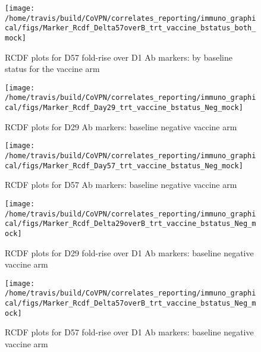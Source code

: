 \documentclass[]{book}
\theoremstyle{definition}
\theoremstyle{definition}
\theoremstyle{definition}
\newcommand{\1}{\mathbbm{1}}
\begin{document}
\begin{figure}[H]

{\centering \texttt{[image: /home/travis/build/CoVPN/correlates\_reporting/immuno\_graphical/figs/Marker\_Rcdf\_Delta57overB\_trt\_vaccine\_bstatus\_both\_mock]} 

}

\caption{RCDF plots for D57 fold-rise over D1 Ab markers: by baseline status for the vaccine arm}\label{fig:unnamed-chunk-28}
\end{figure}

\begin{figure}[H]

{\centering \texttt{[image: /home/travis/build/CoVPN/correlates\_reporting/immuno\_graphical/figs/Marker\_Rcdf\_Day29\_trt\_vaccine\_bstatus\_Neg\_mock]} 

}

\caption{RCDF plots for D29 Ab markers: baseline negative vaccine arm}\label{fig:unnamed-chunk-29}
\end{figure}

\begin{figure}[H]

{\centering \texttt{[image: /home/travis/build/CoVPN/correlates\_reporting/immuno\_graphical/figs/Marker\_Rcdf\_Day57\_trt\_vaccine\_bstatus\_Neg\_mock]} 

}

\caption{RCDF plots for D57 Ab markers: baseline negative vaccine arm}\label{fig:unnamed-chunk-30}
\end{figure}

\begin{figure}[H]

{\centering \texttt{[image: /home/travis/build/CoVPN/correlates\_reporting/immuno\_graphical/figs/Marker\_Rcdf\_Delta29overB\_trt\_vaccine\_bstatus\_Neg\_mock]} 

}

\caption{RCDF plots for D29 fold-rise over D1 Ab markers: baseline negative vaccine arm}\label{fig:unnamed-chunk-31}
\end{figure}

\begin{figure}[H]

{\centering \texttt{[image: /home/travis/build/CoVPN/correlates\_reporting/immuno\_graphical/figs/Marker\_Rcdf\_Delta57overB\_trt\_vaccine\_bstatus\_Neg\_mock]} 

}

\caption{RCDF plots for D57 fold-rise over D1 Ab markers: baseline negative vaccine arm}\label{fig:unnamed-chunk-32}
\end{figure}
\end{document}
